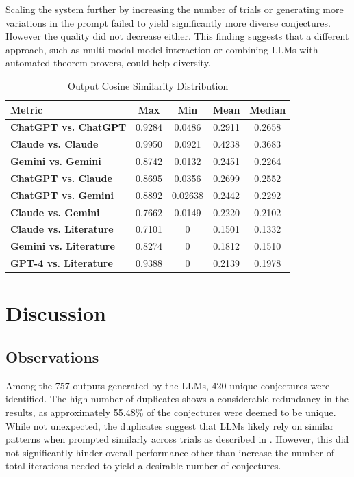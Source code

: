 \documentclass{article}
\begin{document}
Scaling the system further by increasing the number of trials or generating more variations in the prompt failed to yield significantly more diverse conjectures. However the quality did not decrease either. This finding suggests that a different approach, such as multi-modal model interaction or combining LLMs with automated theorem provers, could help diversity. 
\begin{table}[ht] 
\centering 
\caption{Output Cosine Similarity Distribution} 
\begin{tabular}{lcccc} 
\toprule 
\textbf{Metric} & \textbf{Max} & \textbf{Min} & \textbf{Mean} & \textbf{Median} \\ 
\midrule 
\textbf{ChatGPT vs. ChatGPT} & 0.9284 & 0.0486 & 0.2911 & 0.2658 \\ 
\textbf{Claude vs. Claude} & 0.9950 & 0.0921 & 0.4238 & 0.3683 \\ 
\textbf{Gemini vs. Gemini} & 0.8742 & 0.0132 & 0.2451 & 0.2264 \\ 
\textbf{ChatGPT vs. Claude} & 0.8695 & 0.0356 & 0.2699 & 0.2552 \\ 
\textbf{ChatGPT vs. Gemini} & 0.8892 & 0.02638 & 0.2442 & 0.2292 \\ 
\textbf{Claude vs. Gemini} & 0.7662 & 0.0149 & 0.2220 & 0.2102 \\ 
\textbf{Claude vs. Literature} & 0.7101 & 0 & 0.1501 & 0.1332 \\ 
\textbf{Gemini vs. Literature} & 0.8274 & 0 & 0.1812 & 0.1510  \\ 
\textbf{GPT-4 vs. Literature} & 0.9388 & 0 & 0.2139 & 0.1978 \\ 

\bottomrule 
\end{tabular} 
\label{tab:similarity} 
\end{table}
\section{Discussion}
\subsection{Observations} Among the 757 outputs generated by the LLMs, 420 unique conjectures were identified. The high number of duplicates shows a considerable redundancy in the results, as approximately 55.48\% of the conjectures were deemed to be unique. While not unexpected, the duplicates suggest that LLMs likely rely on similar patterns when prompted similarly across trials as described in \cite{JohanssonS23}. However, this did not significantly hinder overall performance other than increase the number of total iterations needed to yield a desirable number of conjectures. 
\end{document}
